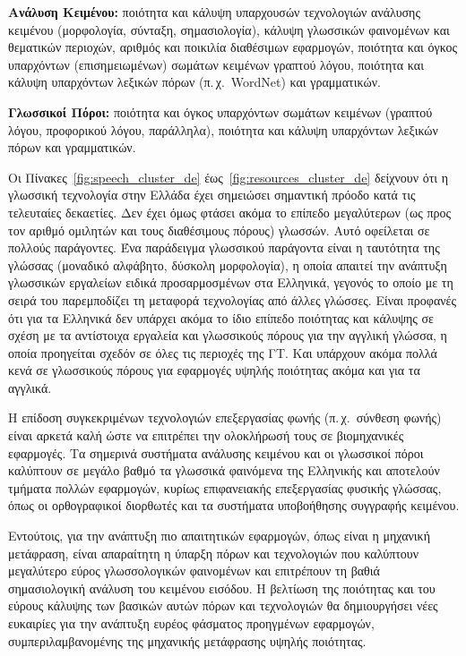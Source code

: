 \documentclass[]{../../metanetpaper}
\begin{document}
\begin{multicols}{2}
\textbf{Ανάλυση Κειμένου:} ποιότητα και κάλυψη υπαρχουσών τεχνολογιών ανάλυσης κειμένου (μορφολογία, σύνταξη, σημασιολογία), κάλυψη γλωσσικών φαινομένων και θεματικών περιοχών, αριθμός και ποικιλία διαθέσιμων εφαρμογών, ποιότητα και όγκος υπαρχόντων (επισημειωμένων) σωμάτων κειμένων γραπτού λόγου, ποιότητα και κάλυψη υπαρχόντων λεξικών πόρων (π.\,χ.~WordNet) και γραμματικών.

\textbf{Γλωσσικοί Πόροι:} ποιότητα και όγκος υπαρχόντων σωμάτων κειμένων (γραπτού λόγου, προφορικού λόγου, παράλληλα), ποιότητα και κάλυψη υπαρχόντων λεξικών πόρων και γραμματικών.

Οι Πίνακες~\ref{fig:speech_cluster_de} έως~\ref{fig:resources_cluster_de} δείχνουν ότι η γλωσσική τεχνολογία στην Ελλάδα έχει σημειώσει σημαντική πρόοδο κατά τις τελευταίες δεκαετίες. Δεν έχει όμως φτάσει ακόμα το επίπεδο μεγαλύτερων (ως προς τον αριθμό ομιλητών και τους διαθέσιμους πόρους) γλωσσών. Αυτό οφείλεται σε πολλούς παράγοντες. Ένα παράδειγμα γλωσσικού παράγοντα είναι η ταυτότητα της γλώσσας (μοναδικό αλφάβητο, δύσκολη μορφολογία), η οποία απαιτεί την ανάπτυξη γλωσσικών εργαλείων ειδικά προσαρμοσμένων στα Ελληνικά, γεγονός το οποίο με τη σειρά του παρεμποδίζει τη μεταφορά τεχνολογίας από άλλες γλώσσες. Είναι προφανές ότι για τα Ελληνικά δεν υπάρχει ακόμα το ίδιο επίπεδο ποιότητας και κάλυψης σε σχέση με τα αντίστοιχα εργαλεία και γλωσσικούς πόρους για την αγγλική γλώσσα, η οποία προηγείται σχεδόν σε όλες τις περιοχές της ΓΤ. Και υπάρχουν ακόμα πολλά κενά σε γλωσσικούς πόρους για εφαρμογές υψηλής ποιότητας ακόμα και για τα αγγλικά.

Η επίδοση συγκεκριμένων τεχνολογιών επεξεργασίας φωνής (π.\,χ.~σύνθεση φωνής) είναι αρκετά καλή ώστε να επιτρέπει την ολοκλήρωσή τους σε βιομηχανικές εφαρμογές. Τα σημερινά συστήματα ανάλυσης κειμένου και οι γλωσσικοί πόροι καλύπτουν σε μεγάλο βαθμό τα γλωσσικά φαινόμενα της Ελληνικής και αποτελούν τμήματα πολλών εφαρμογών, κυρίως επιφανειακής επεξεργασίας φυσικής γλώσσας, όπως οι ορθογραφικοί διορθωτές και τα συστήματα υποβοήθησης συγγραφής κειμένου.

Εντούτοις, για την ανάπτυξη πιο απαιτητικών εφαρμογών, όπως είναι η μηχανική μετάφραση, είναι απαραίτητη η ύπαρξη πόρων και τεχνολογιών που καλύπτουν μεγαλύτερο εύρος γλωσσολογικών φαινομένων και επιτρέπουν τη βαθιά σημασιολογική ανάλυση του κειμένου εισόδου. Η βελτίωση της ποιότητας και του εύρους κάλυψης των βασικών αυτών πόρων και τεχνολογιών θα δημιουργήσει νέες ευκαιρίες για την ανάπτυξη ευρέος φάσματος προηγμένων εφαρμογών, συμπεριλαμβανομένης της μηχανικής μετάφρασης υψηλής ποιότητας.


\end{multicols}
\end{document}
